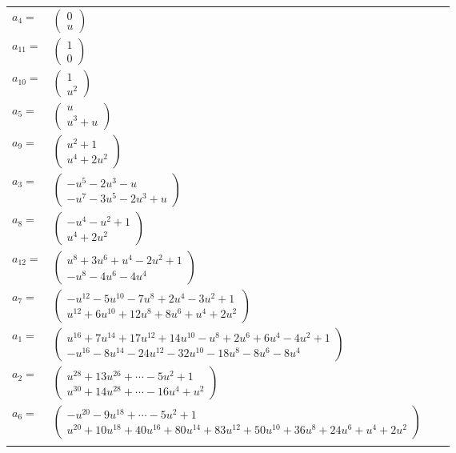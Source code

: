 \documentclass[1p]{elsarticle_modified}
\theoremstyle{definition}
\begin{document}
\begin{tabular}{m{7pt} m{180pt} m{7pt} m{180pt} }
\flushright $a_{4}=$&$\begin{pmatrix}0\\u\end{pmatrix}$ \\
\flushright $a_{11}=$&$\begin{pmatrix}1\\0\end{pmatrix}$ \\
\flushright $a_{10}=$&$\begin{pmatrix}1\\u^2\end{pmatrix}$ \\
\flushright $a_{5}=$&$\begin{pmatrix}u\\u^3+u\end{pmatrix}$ \\
\flushright $a_{9}=$&$\begin{pmatrix}u^2+1\\u^4+2 u^2\end{pmatrix}$ \\
\flushright $a_{3}=$&$\begin{pmatrix}- u^5-2 u^3- u\\- u^7-3 u^5-2 u^3+u\end{pmatrix}$ \\
\flushright $a_{8}=$&$\begin{pmatrix}- u^4- u^2+1\\u^4+2 u^2\end{pmatrix}$ \\
\flushright $a_{12}=$&$\begin{pmatrix}u^8+3 u^6+u^4-2 u^2+1\\- u^8-4 u^6-4 u^4\end{pmatrix}$ \\
\flushright $a_{7}=$&$\begin{pmatrix}- u^{12}-5 u^{10}-7 u^8+2 u^4-3 u^2+1\\u^{12}+6 u^{10}+12 u^8+8 u^6+u^4+2 u^2\end{pmatrix}$ \\
\flushright $a_{1}=$&$\begin{pmatrix}u^{16}+7 u^{14}+17 u^{12}+14 u^{10}- u^8+2 u^6+6 u^4-4 u^2+1\\- u^{16}-8 u^{14}-24 u^{12}-32 u^{10}-18 u^8-8 u^6-8 u^4\end{pmatrix}$ \\
\flushright $a_{2}=$&$\begin{pmatrix}u^{28}+13 u^{26}+\cdots-5 u^2+1\\u^{30}+14 u^{28}+\cdots-16 u^4+u^2\end{pmatrix}$ \\
\flushright $a_{6}=$&$\begin{pmatrix}- u^{20}-9 u^{18}+\cdots-5 u^2+1\\u^{20}+10 u^{18}+40 u^{16}+80 u^{14}+83 u^{12}+50 u^{10}+36 u^8+24 u^6+u^4+2 u^2\end{pmatrix}$\\&\end{tabular}
\end{document}
